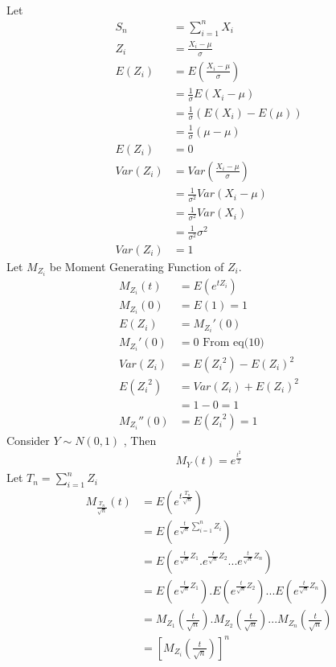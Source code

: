 \documentclass[journal,12pt,twocolumn]{IEEEtran}
\begin{document}
\\Let
\begin{align}
    S_n &= \sum_{i=1}^{n} X_i\\
    Z_i &= \frac{X_i-\mu}{\sigma}\\
    E(Z_i)&=E(\frac{X_i-\mu}{\sigma})\\
    &= \frac{1}{\sigma}E(X_i - \mu)\nonumber\\
    &= \frac{1}{\sigma}(E(X_i)-E(\mu))\nonumber\\
    &= \frac{1}{\sigma}(\mu -\mu)\nonumber\\
    E(Z_i)&=0\\
    Var(Z_i)&=Var(\frac{X_i-\mu}{\sigma})\\
    &=\frac{1}{\sigma^2}Var(X_i-\mu)\nonumber\\
    &=\frac{1}{\sigma^2}Var(X_i)\nonumber\\
    &=\frac{1}{\sigma^2}\sigma^2\nonumber\\
    Var(Z_i)&=1
    \end{align}
Let $M_{Z_i}$ be Moment Generating Function of $Z_i$.
\begin{align}
      M_{Z_i}(t)&=E(e^{tZ_i})\\
      M_{Z_i}(0)&=E(1)=1\\
      E(Z_i)&=M_{Z_i}'(0)\\
      M_{Z_i}'(0)&=0 \text{ From eq(10)}\\
      Var(Z_i)&=E({Z_i}^2)-{E(Z_i)^2}\\
      E({Z_i}^2)&=Var(Z_i)+E(Z_i)^2\nonumber\\
      &=1-0=1\nonumber\\
      M_{Z_i}''(0)&=E({Z_i}^2)=1
    \end{align}
Consider $Y \sim N(0,1)$ , Then
\begin{align}
    M_Y(t)=e^{\frac{t^2}{2}}
    \end{align}
Let $T_n=\sum_{i=1}^{n} Z_i$
\begin{align}
    M_{\frac{T_n}{\sqrt{n}}}(t)&=E(e^{t\frac{T_n}{\sqrt{n}}})\\
    &=E(e^{\frac{t}{\sqrt{n}}\sum_{i=1}^{n} Z_i})\nonumber\\
    &=E(e^{\frac{t}{\sqrt{n}}Z_1}.e^{\frac{t}{\sqrt{n}}Z_2}...e^{\frac{t}{\sqrt{n}} Z_n})\nonumber\\
    &=E(e^{\frac{t}{\sqrt{n}}Z_1}).E(e^{\frac{t}{\sqrt{n}}Z_2})...E(e^{\frac{t}{\sqrt{n}}Z_n})\nonumber\\
    &=M_{Z_1}(\frac{t}{\sqrt{n}}).M_{Z_2}(\frac{t}{\sqrt{n}})...M_{Z_n}(\frac{t}{\sqrt{n}})\nonumber\\
    &=[M_{Z_i}(\frac{t}{\sqrt{n}})]^n
    \end{align}
\end{document}
